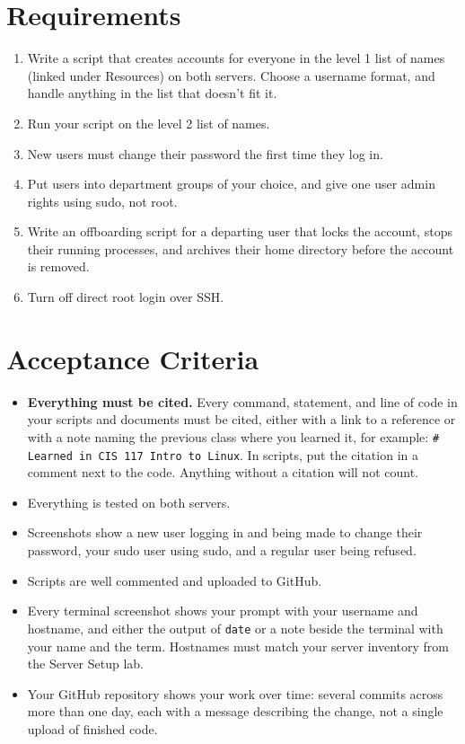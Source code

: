 \documentclass[12pt]{article}
\begin{document}
\section*{Requirements}
\begin{enumerate}
    \item Write a script that creates accounts for everyone in the level 1 list of names (linked under Resources) on both servers. Choose a username format, and handle anything in the list that doesn't fit it.
    \item Run your script on the level 2 list of names.
    \item New users must change their password the first time they log in.
    \item Put users into department groups of your choice, and give one user admin rights using sudo, not root.
    \item Write an offboarding script for a departing user that locks the account, stops their running processes, and archives their home directory before the account is removed.
    \item Turn off direct root login over SSH.
\end{enumerate}

\section*{Acceptance Criteria}
\begin{itemize}
    \item \textbf{Everything must be cited.} Every command, statement, and line of code in your scripts and documents must be cited, either with a link to a reference or with a note naming the previous class where you learned it, for example: \texttt{\# Learned in CIS 117 Intro to Linux}. In scripts, put the citation in a comment next to the code. Anything without a citation will not count.
    \item Everything is tested on both servers.
    \item Screenshots show a new user logging in and being made to change their password, your sudo user using sudo, and a regular user being refused.
    \item Scripts are well commented and uploaded to GitHub.
    \item Every terminal screenshot shows your prompt with your username and hostname, and either the output of \texttt{date} or a note beside the terminal with your name and the term. Hostnames must match your server inventory from the Server Setup lab.
    \item Your GitHub repository shows your work over time: several commits across more than one day, each with a message describing the change, not a single upload of finished code.
\end{itemize}
\end{document}
